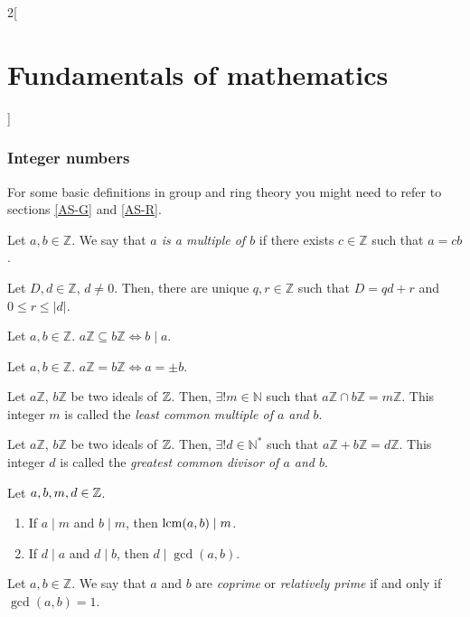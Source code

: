 \documentclass[../../../main.tex]{subfiles}
\begin{document}
\begin{multicols}{2}[\section{Fundamentals of mathematics}]
    \subsubsection*{Integer numbers}
    For some basic definitions in group and ring theory you might need to refer to sections \ref{AS-G} and \ref{AS-R}.
    \begin{definition}
        Let $a,b\in\mathbb{Z}$. We say that \textit{$a$ is a multiple of $b$} if there exists $c\in\mathbb{Z}$ such that $a=cb$.
    \end{definition}
    \begin{theorem}
        Let $D,d\in\mathbb{Z}$, $d\ne 0$. Then, there are unique $q,r\in\mathbb{Z}$ such that $D=qd+r$ and $0\leq r\leq|d|$.
    \end{theorem}
    \begin{prop}
        Let $a,b\in \mathbb{Z}$. $a\mathbb{Z}\subseteq b\mathbb{Z}\iff b\mid a$.
    \end{prop}
    \begin{corollary}
        Let $a,b\in \mathbb{Z}$. $a\mathbb{Z}=b\mathbb{Z}\iff a=\pm b$.
    \end{corollary}
    \begin{prop}
        Let $a\mathbb{Z}$, $b\mathbb{Z}$ be two ideals of $\mathbb{Z}$. Then, $\exists!m\in\mathbb{N}$ such that $a\mathbb{Z}\cap b\mathbb{Z}=m\mathbb{Z}$. This integer $m$ is called the \textit{least common multiple of $a$ and $b$}.
    \end{prop}
    \begin{prop}
        Let $a\mathbb{Z}$, $b\mathbb{Z}$ be two ideals of $\mathbb{Z}$. Then, $\exists!d\in\mathbb{N}^*$ such that $a\mathbb{Z}+b\mathbb{Z}=d\mathbb{Z}$. This integer $d$ is called the \textit{greatest common divisor of $a$ and $b$}.
    \end{prop}
    \begin{prop}
        Let $a,b,m,d\in\mathbb{Z}$.
        \begin{enumerate}
            \item If $a\mid m$ and $b\mid m$, then $\operatorname{lcm}(a,b)\mid m$.
            \item If $d\mid a$ and $d\mid b$, then $d\mid\gcd(a,b)$.
        \end{enumerate}
    \end{prop}
    \begin{definition}
        Let $a,b\in\mathbb{Z}$. We say that $a$ and $b$ are \textit{coprime} or \textit{relatively prime} if and only if $\gcd(a,b)=1$.
    \end{definition}

\end{multicols}
\end{document}
